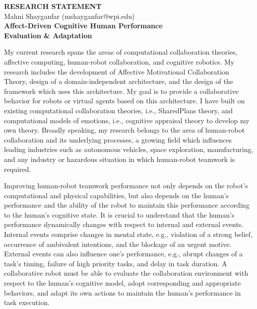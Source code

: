 \documentclass[a4paper, 11pt]{article}
\begin{document}
\thispagestyle{fancy}

\lhead{}
\rhead{}

\renewcommand{\headrulewidth}{0pt} 
\renewcommand{\footrulewidth}{0pt} 

\pagestyle{fancy}

\rhead{\textcolor{gray}{\thepage/\totalpages{}}}

\begin{small}

\begin{center}
{\LARGE \bf RESEARCH STATEMENT}\\
\vspace*{0.1cm}
{\normalsize Mahni Shayganfar (mshayganfar@wpi.edu)}
\vspace{6mm}\\
{\Large \bf Affect-Driven Cognitive Human Performance \\Evaluation \&
Adaptation}\\
\end{center}

My current research spans the areas of computational collaboration theories,
affective computing, human-robot collaboration, and cognitive robotics. My
research includes the development of Affective Motivational Collaboration
Theory, design of a domain-independent architecture, and the design of the
framework which uses this architecture. My goal is to provide a collaborative
behavior for robots or virtual agents based on this architecture. I have built
on existing computational collaboration theories, i.e., SharedPlans theory, and
computational models of emotions, i.e., cognitive appraisal theory to develop my
own theory. Broadly speaking, my research belongs to the area of human-robot
collaboration and its underlying processes, a growing field which influences
leading industries such as autonomous vehicles, space exploration,
manufacturing, and any industry or hazardous situation in which human-robot
teamwork is required.

Improving human-robot teamwork performance not only depends on the robot's
computational and physical capabilities, but also depends on the human's
performance and the ability of the robot to maintain this performance according
to the human's cognitive state. It is crucial to understand that the human's
performance dynamically changes with respect to internal and external events.
Internal events comprise changes in mental state, e.g., violation of a
strong belief, occurrence of ambivalent intentions, and the blockage of an urgent
motive. External events can also influence one's performance, e.g., abrupt
changes of a task's timing, failure of high priority tasks, and delay in task
duration. A collaborative robot must be able to evaluate the collaboration
environment with respect to the human's cognitive model, adopt corresponding and
appropriate behaviors, and adapt its own actions to maintain the human's
performance in task execution.


\end{small}
\end{document}
